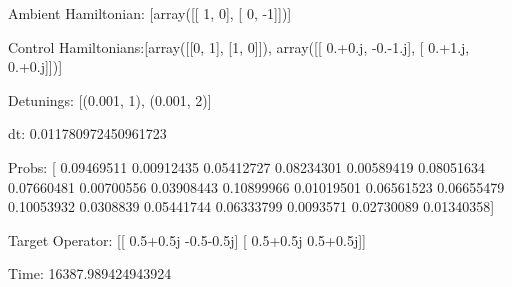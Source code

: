 \documentclass{article}
\begin{document}
    

\newpage

Ambient Hamiltonian: [array([[ 1,  0],
       [ 0, -1]])]

Control Hamiltonians:[array([[0, 1],
       [1, 0]]), array([[ 0.+0.j, -0.-1.j],
       [ 0.+1.j,  0.+0.j]])]

Detunings: [(0.001, 1), (0.001, 2)]

 dt: 0.011780972450961723

Probs: [ 0.09469511  0.00912435  0.05412727  0.08234301  0.00589419  0.08051634
  0.07660481  0.00700556  0.03908443  0.10899966  0.01019501  0.06561523
  0.06655479  0.10053932  0.0308839   0.05441744  0.06333799  0.0093571
  0.02730089  0.01340358]

Target Operator: [[ 0.5+0.5j -0.5-0.5j]
 [ 0.5+0.5j  0.5+0.5j]]

Time: 16387.989424943924
\end{document}
